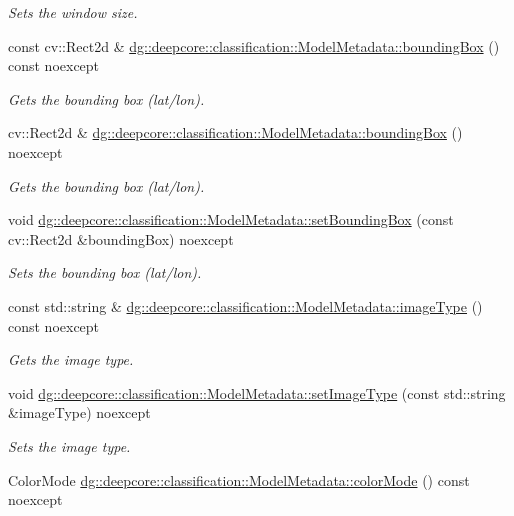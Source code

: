 \begin{DoxyCompactItemize}
\begin{DoxyCompactList}\small\item\em Sets the window size. \end{DoxyCompactList}\item 
const cv\+::\+Rect2d \& \hyperlink{group___classification_module_ga69944ef95e7eeb403596b0f25eb677ec}{dg\+::deepcore\+::classification\+::\+Model\+Metadata\+::bounding\+Box} () const noexcept
\begin{DoxyCompactList}\small\item\em Gets the bounding box (lat/lon). \end{DoxyCompactList}\item 
cv\+::\+Rect2d \& \hyperlink{group___classification_module_gae4241cbe434313f9cc26d1d030ec9655}{dg\+::deepcore\+::classification\+::\+Model\+Metadata\+::bounding\+Box} () noexcept
\begin{DoxyCompactList}\small\item\em Gets the bounding box (lat/lon). \end{DoxyCompactList}\item 
void \hyperlink{group___classification_module_gab38e9f9c894441321a28a2074f91e5da}{dg\+::deepcore\+::classification\+::\+Model\+Metadata\+::set\+Bounding\+Box} (const cv\+::\+Rect2d \&bounding\+Box) noexcept
\begin{DoxyCompactList}\small\item\em Sets the bounding box (lat/lon). \end{DoxyCompactList}\item 
const std\+::string \& \hyperlink{group___classification_module_ga572f92d09d217ff3a0661fe9f6df4247}{dg\+::deepcore\+::classification\+::\+Model\+Metadata\+::image\+Type} () const noexcept
\begin{DoxyCompactList}\small\item\em Gets the image type. \end{DoxyCompactList}\item 
void \hyperlink{group___classification_module_gaa2aa1b5aadc48ff8dea850aa061bcf2f}{dg\+::deepcore\+::classification\+::\+Model\+Metadata\+::set\+Image\+Type} (const std\+::string \&image\+Type) noexcept
\begin{DoxyCompactList}\small\item\em Sets the image type. \end{DoxyCompactList}\item 
Color\+Mode \hyperlink{group___classification_module_ga3ba94c7945195ba13d1698849926656f}{dg\+::deepcore\+::classification\+::\+Model\+Metadata\+::color\+Mode} () const noexcept

\end{DoxyCompactItemize}

